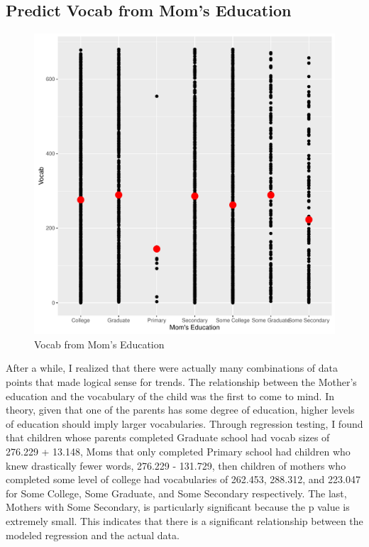 \documentclass{article}
\begin{document}
    \subsection*{Predict Vocab from Mom's Education}
      \begin{figure}[H]
        \includegraphics[width=\linewidth]{vocab_from_mom_ed.pdf}
        \caption{Vocab from Mom's Education}
        \label{fig:regression3}
      \end{figure}
      After a while, I realized that there were actually many combinations of data points
      that made logical sense for trends. The relationship between the Mother's education
      and the vocabulary of the child was the first to come to mind. In theory, given that one of the 
      parents has some degree of education, higher levels of education should imply
      larger vocabularies. 
      Through regression testing, I found that children whose parents completed
      Graduate school had vocab sizes of 276.229 + 13.148, Moms that only completed
      Primary school had children who knew drastically fewer words, 276.229 - 131.729,
      then children of mothers who completed some level of college had vocabularies of
      262.453, 288.312, and 223.047 for Some College, Some Graduate, and Some Secondary 
      respectively. 
      The last, Mothers with Some Secondary, is particularly significant because the p value
      is extremely small. This indicates that there is a significant relationship between
      the modeled regression and the actual data. 
      
\end{document}
